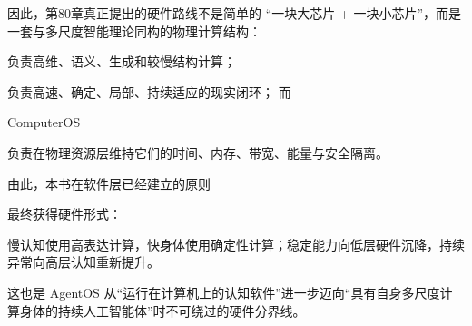 因此，第80章真正提出的硬件路线不是简单的 ``一块大芯片 + 一块小芯片''，而是一套与多尺度智能理论同构的物理计算结构：
\begin{statementbox}
\centering
{}
\end{statementbox}
负责高维、语义、生成和较慢结构计算；
\begin{statementbox}
\centering
{}
\end{statementbox}
负责高速、确定、局部、持续适应的现实闭环；
而
\begin{statementbox}
ComputerOS
\end{statementbox}
负责在物理资源层维持它们的时间、内存、带宽、能量与安全隔离。

由此，本书在软件层已经建立的原则
\begin{statementbox}
\centering
{}
\end{statementbox}
最终获得硬件形式：
\begin{statementbox}
慢认知使用高表达计算，快身体使用确定性计算；稳定能力向低层硬件沉降，持续异常向高层认知重新提升。
\end{statementbox}
这也是 AgentOS 从“运行在计算机上的认知软件”进一步迈向“具有自身多尺度计算身体的持续人工智能体”时不可绕过的硬件分界线。
